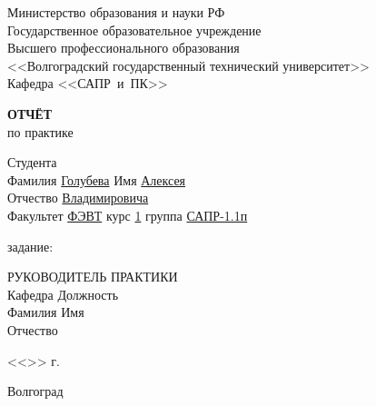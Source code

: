 \begin{titlepage}
    \begin{center}
        Министерство образования и науки РФ \\
        Государственное образовательное учреждение\\
        Высшего профессионального образования\\
        <<Волгоградский государственный технический университет>>\\
        Кафедра <<САПР~и~ПК>>
    \end{center}
    \vspace{2.0cm}
    \begin{center}
        \large \textbf{ОТЧЁТ} \\
        по практике
    \end{center}
    \begin{flushleft}
        Студента\\
        Фамилия \underline{Голубева\hspace{3.1cm}} 
        Имя \underline{Алексея\hspace{2.1cm}}\\
        Отчество \underline{Владимировича\hspace{1.6cm}}\\
        Факультет \underline{ФЭВТ\hspace{3.45cm}} курс \underline{1\hspace{1.5cm}} 
        группа \underline{САПР-1.1п\hspace{1.9cm}}\\
    \end{flushleft}
    \vspace{1.0cm}
     задание: \underline{\hspace{11.25cm}}\\
    \underline{\hspace{\textwidth}}
    \vspace{1.0cm}
    \begin{flushleft}
        РУКОВОДИТЕЛЬ ПРАКТИКИ\\
        Кафедра \underline{\hspace{5.15cm}} Должность \underline{\hspace{5cm}} \\
        Фамилия \underline{\hspace{5cm}} Имя \underline{\hspace{6.5cm}}\\
        Отчество \underline{\hspace{5cm}}
    \end{flushleft}
    \vspace{1.5cm}
    \begin{flushright}
        <<\underline{\hspace{1.0cm}}>>\underline{\hspace{4.0cm}} \the\year г.
    \end{flushright}
    \vspace{\fill}
    \begin{center}
        Волгоград \the\year
    \end{center}
\end{titlepage}
